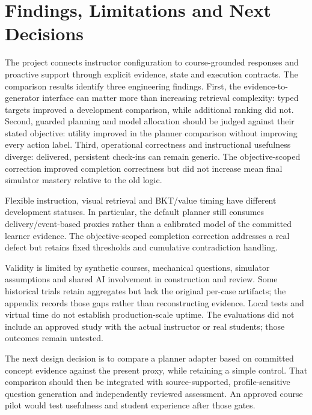 \section{Findings, Limitations and Next Decisions}
The project connects instructor configuration to course-grounded responses and
proactive support through explicit evidence, state and execution contracts.
The comparison results identify three engineering findings. First, the
evidence-to-generator interface can matter more than increasing retrieval
complexity: typed targets improved a development comparison, while additional
ranking did not. Second, guarded planning and model allocation should be judged
against their stated objective: utility improved in the planner comparison
without improving every action label. Third, operational correctness and
instructional usefulness diverge: delivered, persistent check-ins can remain
generic. The objective-scoped correction improved completion correctness but
did not increase mean final simulator mastery relative to the old logic.

Flexible instruction, visual
retrieval and BKT/value timing have different development statuses. In
particular, the default planner still consumes delivery/event-based proxies
rather than a calibrated model of the committed learner evidence. The
objective-scoped completion correction addresses a real defect but retains
fixed thresholds and cumulative contradiction handling.

Validity is limited by synthetic courses, mechanical questions, simulator
assumptions and shared AI involvement in construction and review. Some
historical trials retain aggregates but lack the original per-case artifacts;
the appendix records those gaps rather than reconstructing evidence. Local
tests and virtual time do not establish production-scale uptime. The evaluations did not include an approved study with the actual instructor
or real students; those outcomes remain untested.

The next design decision is to compare a planner adapter based on committed
concept evidence against the present proxy, while retaining a simple control.
That comparison should then be integrated with source-supported,
profile-sensitive question generation and independently reviewed assessment.
An approved course pilot would test usefulness and student experience after
those gates. 